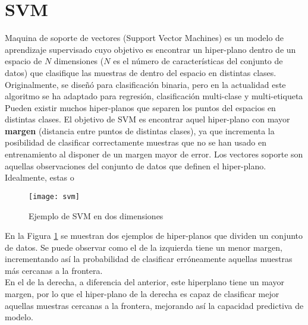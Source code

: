 \section{SVM}
\label{alg:svm}
Maquina de soporte de vectores (Support Vector Machines) es un modelo de aprendizaje supervisado cuyo objetivo es encontrar un hiper-plano dentro de un espacio de $N$ dimensiones ($N$ es el número de características del conjunto de datos) que clasifique las muestras de dentro del espacio en distintas clases. Originalmente, se diseñó para clasificación binaria, pero en la actualidad este algoritmo se ha adaptado para regresión, clasificación multi-clase y multi-etiqueta\\
\linebreak
Pueden existir muchos hiper-planos que separen los puntos del espacios en distintas clases. El objetivo de SVM es encontrar aquel hiper-plano con mayor \textbf{margen} (distancia entre puntos de distintas clases), ya que incrementa la posibilidad de clasificar correctamente muestras que no se han usado en entrenamiento al disponer de un margen mayor de error. Los vectores soporte son aquellas observaciones del conjunto de datos que definen el hiper-plano. Idealmente, estas o\\
\begin{figure}[H]
	\centering
	\texttt{[image: svm]}
	\caption{Ejemplo de SVM en dos dimensiones}
	\label{fig:svm}
\end{figure}
En la Figura \ref{fig:svm} se muestran dos ejemplos de hiper-planos que dividen un conjunto de datos. Se puede observar como el de la izquierda tiene un menor margen, incrementando así la probabilidad de clasificar erróneamente aquellas muestras más cercanas a la frontera.\\
En el de la derecha, a diferencia del anterior, este hiperplano tiene un mayor margen, por lo que el hiper-plano de la derecha es capaz de clasificar mejor aquellas muestras cercanas a la frontera, mejorando así la capacidad predictiva de modelo.
\clearpage 

